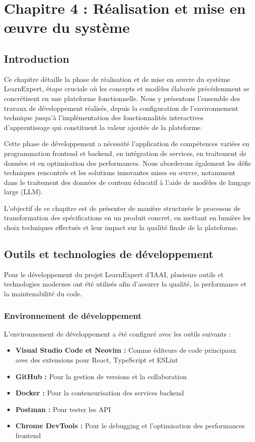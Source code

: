 \chapter*{Chapitre 4 : Réalisation et mise en œuvre du système}
\thispagestyle{fancy}
\setcounter{section}{0}
\newpage

\section{Introduction}

Ce chapitre détaille la phase de réalisation et de mise en œuvre du système LearnExpert, étape cruciale où les concepts et modèles élaborés précédemment se concrétisent en une plateforme fonctionnelle. Nous y présentons l'ensemble des travaux de développement réalisés, depuis la configuration de l'environnement technique jusqu'à l'implémentation des fonctionnalités interactives d'apprentissage qui constituent la valeur ajoutée de la plateforme.

Cette phase de développement a nécessité l'application de compétences variées en programmation frontend et backend, en intégration de services, en traitement de données et en optimisation des performances. Nous aborderons également les défis techniques rencontrés et les solutions innovantes mises en œuvre, notamment dans le traitement des données de contenu éducatif à l'aide de modèles de langage large (LLM).

L'objectif de ce chapitre est de présenter de manière structurée le processus de transformation des spécifications en un produit concret, en mettant en lumière les choix techniques effectués et leur impact sur la qualité finale de la plateforme.

\section{Outils et technologies de développement}
Pour le développement du projet LearnExpert d'IAAI, plusieurs outils et technologies modernes ont été utilisés afin d'assurer la qualité, la performance et la maintenabilité du code.

\subsection{Environnement de développement}
L'environnement de développement a été configuré avec les outils suivants :
\begin{itemize}
  \item \textbf{Visual Studio Code et Neovim :} Comme éditeurs de code principaux avec des extensions pour React, TypeScript et ESLint
  \item \textbf{GitHub :} Pour la gestion de versions et la collaboration
  \item \textbf{Docker :} Pour la conteneurisation des services backend
  \item \textbf{Postman :} Pour tester les API
  \item \textbf{Chrome DevTools :} Pour le debugging et l'optimisation des performances frontend
\end{itemize}

